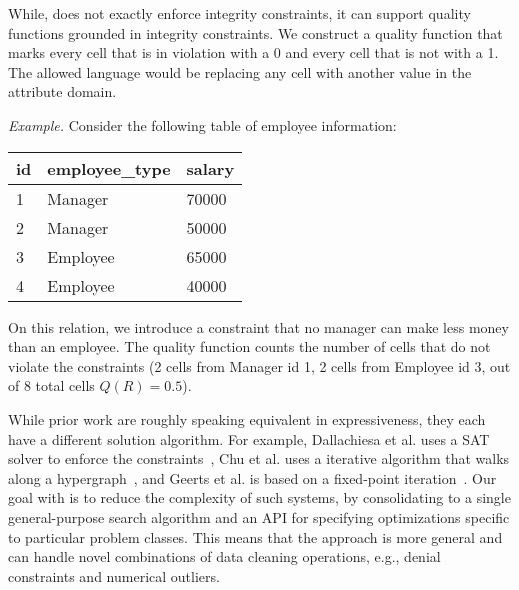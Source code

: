 While, \sys does not exactly enforce integrity constraints, it can support quality functions grounded in integrity constraints. 
We construct a quality function that marks every cell that is in violation with a 0 and every cell that is not with a 1.
The allowed language would be replacing any cell with another value in the attribute domain.

\vspace{0.5em} \noindent \emph{Example.} Consider the following table of employee information:

\begin{table}[ht!]
\centering
\label{my-label}
\begin{tabular}{|l|l|l|}
\hline
\rowcolor[HTML]{000000} 
{\color[HTML]{FFFFFF} id}  & {\color[HTML]{FFFFFF} employee\_type}            & {\color[HTML]{FFFFFF} salary}   \\ \hline
1 & Manager                                & 70000                                  \\ \hline
2 & {\color[HTML]{FE0000}Manager}                                     & {\color[HTML]{FE0000}50000}                                 \\ \hline
3 & {\color[HTML]{FE0000}Employee}                                    & {\color[HTML]{FE0000}65000}                                  \\ \hline
4 & Employee                                & 40000                                  \\ \hline
\end{tabular}
\end{table}
On this relation, we introduce a constraint that no manager can make less money than an employee. The quality function counts the number of cells that do not violate the constraints (2 cells from Manager id 1, 2 cells from Employee id 3, out of 8 total cells $Q(R) = 0.5$).

\vspace{0.5em}

While prior work are roughly speaking equivalent in expressiveness, they each have a different solution algorithm.
For example, Dallachiesa et al. uses a SAT solver to enforce the constraints~\cite{DBLP:conf/sigmod/DallachiesaEEEIOT13}, Chu et al. uses a iterative algorithm that walks along a hypergraph~\cite{chu2013holistic}, and Geerts et al. is based on a fixed-point iteration~\cite{geerts2013llunatic}.
Our goal with \sys is to reduce the complexity of such systems, by consolidating to a single general-purpose search algorithm and an API for specifying optimizations specific to particular problem classes.
This means that the approach is more general and can handle novel combinations of data cleaning operations, e.g., denial constraints and numerical outliers.


